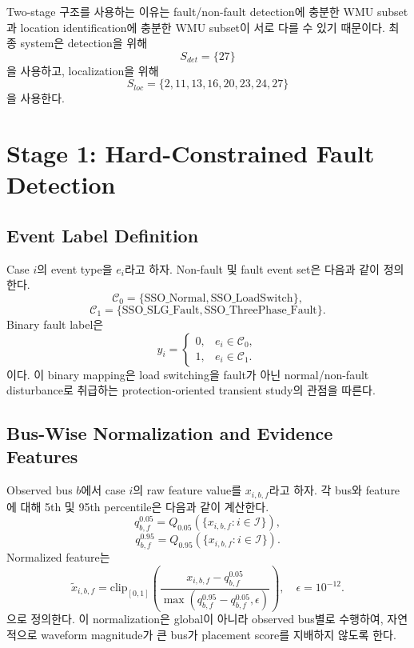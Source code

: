 \documentclass[conference]{IEEEtran}
\begin{document}
Two-stage 구조를 사용하는 이유는 fault/non-fault detection에 충분한 WMU subset과 location identification에 충분한 WMU subset이 서로 다를 수 있기 때문이다. 최종 system은 detection을 위해
\begin{equation}
S_{det}=\{27\}
\end{equation}
을 사용하고, localization을 위해
\begin{equation}
S_{loc}=\{2,11,13,16,20,23,24,27\}
\end{equation}
을 사용한다.

\section{Stage 1: Hard-Constrained Fault Detection}

\subsection{Event Label Definition}

Case $i$의 event type을 $e_i$라고 하자. Non-fault 및 fault event set은 다음과 같이 정의한다.
\begin{equation}
\mathcal{C}_0=\{\mathrm{SSO\_Normal},\mathrm{SSO\_LoadSwitch}\},
\end{equation}
\begin{equation}
\mathcal{C}_1=\{\mathrm{SSO\_SLG\_Fault},\mathrm{SSO\_ThreePhase\_Fault}\}.
\end{equation}
Binary fault label은
\begin{equation}
y_i=\begin{cases}
0, & e_i\in\mathcal{C}_0,\\
1, & e_i\in\mathcal{C}_1.
\end{cases}
\end{equation}
이다. 이 binary mapping은 load switching을 fault가 아닌 normal/non-fault disturbance로 취급하는 protection-oriented transient study의 관점을 따른다.

\subsection{Bus-Wise Normalization and Evidence Features}

Observed bus $b$에서 case $i$의 raw feature value를 $x_{i,b,f}$라고 하자. 각 bus와 feature에 대해 5th 및 95th percentile은 다음과 같이 계산한다.
\begin{equation}
q_{b,f}^{0.05}=Q_{0.05}(\{x_{i,b,f}:i\in\mathcal{I}\}),
\end{equation}
\begin{equation}
q_{b,f}^{0.95}=Q_{0.95}(\{x_{i,b,f}:i\in\mathcal{I}\}).
\end{equation}
Normalized feature는
\begin{equation}
\tilde{x}_{i,b,f}=\mathrm{clip}_{[0,1]}\left(\frac{x_{i,b,f}-q_{b,f}^{0.05}}{\max(q_{b,f}^{0.95}-q_{b,f}^{0.05},\epsilon)}\right),\quad \epsilon=10^{-12}.
\end{equation}
으로 정의한다. 이 normalization은 global이 아니라 observed bus별로 수행하여, 자연적으로 waveform magnitude가 큰 bus가 placement score를 지배하지 않도록 한다.
\end{document}
